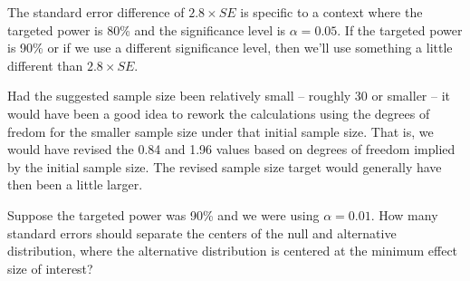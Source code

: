 The standard error difference of $2.8 \times SE$ is specific
to a context where the targeted power is 80\% and the
significance level is $\alpha = 0.05$.
If the targeted power is 90\% or if we use a different
significance level, then we'll use something a little
different than $2.8 \times SE$.

Had the suggested sample size been relatively small
-- roughly 30 or smaller -- it would have been a good idea
to rework the calculations using the degrees of fredom
for the smaller sample size under that initial sample size.
That is, we would have revised the 0.84 and 1.96
values based on degrees of freedom implied by the initial
sample size.
The revised sample size target would generally have then
been a little larger.

%

\begin{exercisewrap}
\begin{nexercise}
Suppose the targeted power was 90\% and we were using
$\alpha = 0.01$.
How many standard errors should separate the centers
of the null and alternative distribution, where the
alternative distribution is centered at the minimum
effect size of interest?\footnotemark{}
\end{nexercise}
\end{exercisewrap}

